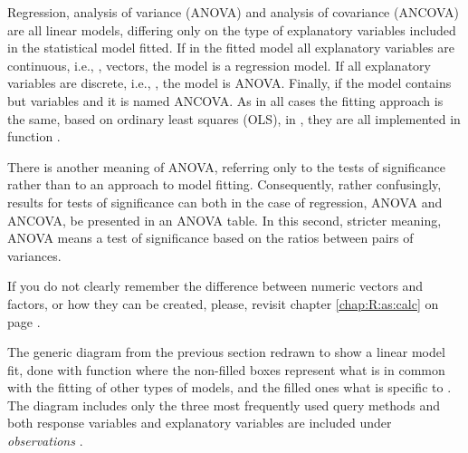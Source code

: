 \documentclass[krantz2]{krantz}\usepackage{knitr}
\begin{document}
Regression, analysis of variance (ANOVA) and analysis of covariance (ANCOVA) are all linear models, differing only on the type of explanatory variables included in the statistical model fitted. If in the fitted model all explanatory variables are continuous, i.e., , vectors, the model is a regression model. If all explanatory variables are discrete, i.e., , the model is ANOVA. Finally, if the model contains but  variables and  it is named ANCOVA. As in all cases the fitting approach is the same, based on ordinary least squares (OLS), in \Rlang, they are all implemented in function .

There is another meaning of ANOVA, referring only to the tests of significance rather than to an approach to model fitting. Consequently, rather confusingly, results for tests of significance can both in the case of regression, ANOVA and ANCOVA, be presented in an ANOVA table. In this second, stricter meaning, ANOVA means a test of significance based on the ratios between pairs of variances.

\begin{warningbox}
If you do not clearly remember the difference between numeric vectors and factors, or how they can be created, please, revisit chapter \ref{chap:R:as:calc} on page \pageref{chap:R:as:calc}.
\end{warningbox}

The generic diagram from the previous section redrawn to show a linear model fit, done with function  where the non-filled boxes represent what is in common with the fitting of other types of models, and the filled ones what is specific to . The diagram includes only the three most frequently used query methods and both response variables and explanatory variables are included under \textsl{observations} .

\begin{center}
\begin{small}
\end{small}
\end{center}
\end{document}
